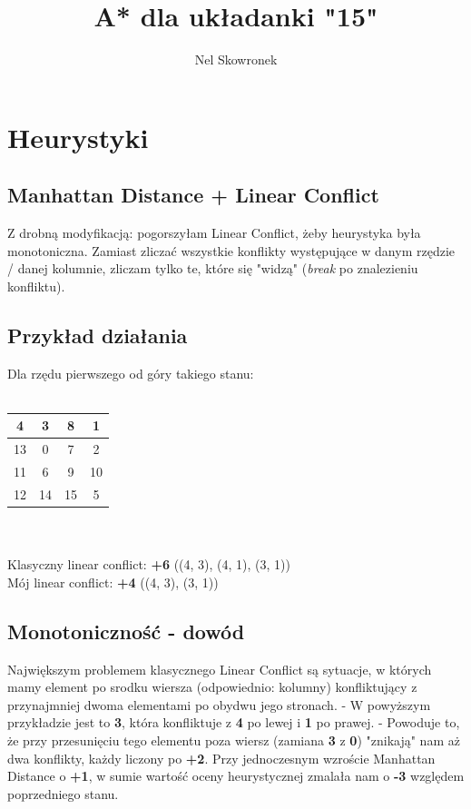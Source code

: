 \documentclass[12pt]{article}
\title{A* dla układanki "15"}
\author{Nel Skowronek}
\date{}
\begin{document}
\maketitle

\section{Heurystyki}

\subsection{Manhattan Distance + Linear Conflict}

Z drobną modyfikacją: pogorszyłam Linear Conflict, żeby heurystyka była monotoniczna. 
Zamiast zliczać wszystkie konflikty występujące w danym rzędzie / danej kolumnie, zliczam 
tylko te, które się "widzą" (\textit{break} po znalezieniu konfliktu).

\subsection*{Przykład działania}

Dla rzędu pierwszego od góry takiego stanu: \\ \\
\begin{tabular}{|c|c|c|c|}
\hline
4 & 3 & 8 & 1 \\
\hline
13 & 0 & 7 & 2 \\
\hline
11 & 6 & 9 & 10 \\
\hline
12 & 14 & 15 & 5 \\
\hline
\end{tabular} \\ \\
Klasyczny linear conflict: \textbf{+6} ((4, 3), (4, 1), (3, 1)) \\ 
Mój linear conflict: \textbf{+4} ((4, 3), (3, 1)) \\

\subsection*{Monotoniczność - dowód}

Największym problemem klasycznego Linear Conflict są sytuacje, w których mamy element po srodku wiersza 
(odpowiednio: kolumny) konfliktujący z przynajmniej dwoma elementami po obydwu jego stronach. 
- W powyższym przykładzie jest to \textbf{3}, która konfliktuje z \textbf{4} po lewej i \textbf{1} po prawej. 
- Powoduje to, że przy przesunięciu tego elementu poza wiersz (zamiana \textbf{3} z \textbf{0}) 
"znikają" nam aż dwa konflikty, każdy liczony po \textbf{+2}. Przy jednoczesnym wzroście Manhattan Distance o \textbf{+1}, 
w sumie wartość oceny heurystycznej zmalała nam o \textbf{-3} względem poprzedniego stanu. \\
\end{document}
